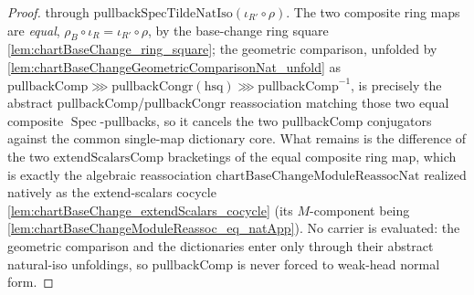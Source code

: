 \begin{lemma}
\begin{proof}
    through \(\mathrm{pullbackSpecTildeNatIso}(\iota_{R'}\circ\rho)\). The two composite ring maps are
    \emph{equal}, \(\rho_B\circ\iota_R = \iota_{R'}\circ\rho\), by the base-change ring square
    \cref{lem:chartBaseChange_ring_square}; the geometric comparison, unfolded by
    \cref{lem:chartBaseChangeGeometricComparisonNat_unfold} as
    \(\mathrm{pullbackComp} \ggg \mathrm{pullbackCongr}(\mathrm{hsq}) \ggg \mathrm{pullbackComp}^{-1}\),
    is precisely the abstract \(\mathrm{pullbackComp}\)/\(\mathrm{pullbackCongr}\) reassociation
    matching those two equal composite \(\operatorname{Spec}\)-pullbacks, so it cancels the two
    \(\mathrm{pullbackComp}\) conjugators against the common single-map dictionary core. What remains
    is the difference of the two \(\mathrm{extendScalarsComp}\) bracketings of the equal composite ring
    map, which is exactly the algebraic reassociation \(\mathrm{chartBaseChangeModuleReassocNat}\)
    realized natively as the extend-scalars cocycle \cref{lem:chartBaseChange_extendScalars_cocycle}
    (its \(M\)-component being \cref{lem:chartBaseChangeModuleReassoc_eq_natApp}). No carrier is
    evaluated: the geometric comparison and the dictionaries enter only through their abstract
    natural-iso unfoldings, so \(\mathrm{pullbackComp}\) is never forced to weak-head normal form.
  \end{proof}
\end{lemma}

